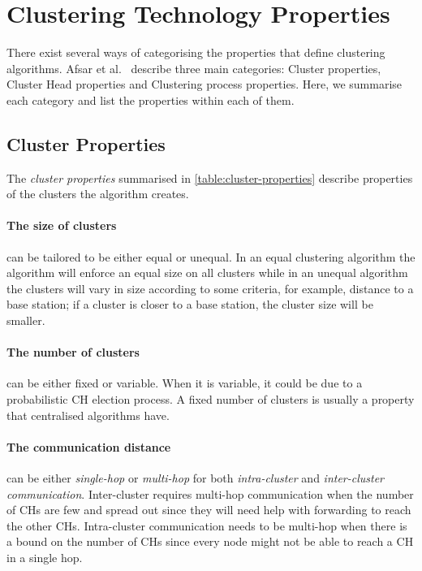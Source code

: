 \section{Clustering Technology Properties}
\label{subsec:background:clustering-algorithm-categorisation}

There exist several ways of categorising the properties that define clustering algorithms. Afsar et al.~\cite{Afsar2014-clustering-survey} describe three main categories: Cluster properties, Cluster Head properties and Clustering process properties. Here, we summarise each category and list the properties within each of them.

\subsection{Cluster Properties}
The \emph{cluster properties} summarised in \cref{table:cluster-properties} describe properties of the clusters the algorithm creates.

\paragraph*{The size of clusters} can be tailored to be either equal or unequal. In an equal clustering algorithm the algorithm will enforce an equal size on all clusters while in an unequal algorithm the clusters will vary in size according to some criteria, for example, distance to a base station; if a cluster is closer to a base station, the cluster size will be smaller.

\paragraph*{The number of clusters} can be either fixed or variable. When it is variable, it could be due to a probabilistic CH election process. A fixed number of clusters is usually a property that centralised algorithms have.

\paragraph*{The communication distance} can be either \textit{single-hop} or \textit{multi-hop} for both \textit{intra-cluster} and \textit{inter-cluster communication}. Inter-cluster requires multi-hop communication when the number of CHs are few and spread out since they will need help with forwarding to reach the other CHs. Intra-cluster communication needs to be multi-hop when there is a bound on the number of CHs since every node might not be able to reach a CH in a single hop.


